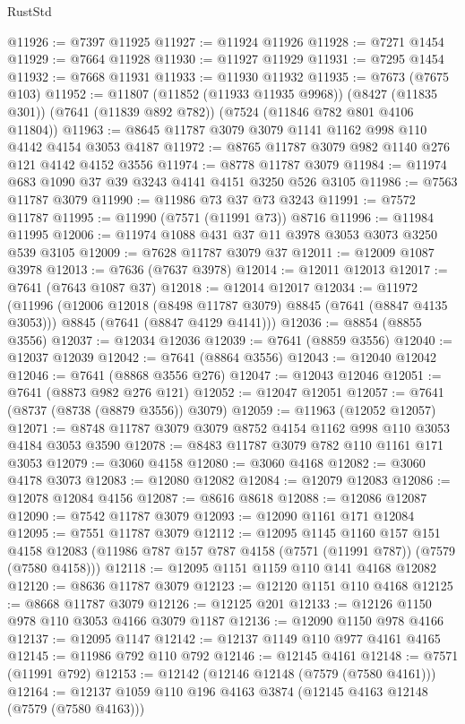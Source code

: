 \begin{lexlean}{RustStd}
\begin{coremodule}
{\begin{coremodule}
{{{{{{{{{{{{{{{{{{{{{{{{{{{{{{{{@11926 := @7397 @11925
@11927 := @11924 @11926
@11928 := @7271 @1454
@11929 := @7664 @11928
@11930 := @11927 @11929
@11931 := @7295 @1454
@11932 := @7668 @11931
@11933 := @11930 @11932
@11935 := @7673 (@7675 @103)
@11952 := @11807
    (@11852 (@11933 @11935 @9968))
    (@8427 (@11835 @301))
    (@7641 (@11839 @892 @782))
    (@7524 (@11846 @782 @801 @4106 @11804))
@11963 := @8645 @11787 @3079 @3079 @1141 @1162 @998 @110 @4142 @4154 @3053 @4187
@11972 := @8765 @11787 @3079 @982 @1140 @276 @121 @4142 @4152 @3556
@11974 := @8778 @11787 @3079
@11984 := @11974 @683 @1090 @37 @39 @3243 @4141 @4151 @3250 @526 @3105
@11986 := @7563 @11787 @3079
@11990 := @11986 @73 @37 @73 @3243
@11991 := @7572 @11787
@11995 := @11990 (@7571 (@11991 @73)) @8716
@11996 := @11984 @11995
@12006 := @11974 @1088 @431 @37 @11 @3978 @3053 @3073 @3250 @539 @3105
@12009 := @7628 @11787 @3079 @37
@12011 := @12009 @1087 @3978
@12013 := @7636 (@7637 @3978)
@12014 := @12011 @12013
@12017 := @7641 (@7643 @1087 @37)
@12018 := @12014 @12017
@12034 := @11972
    (@11996
      (@12006 @12018 (@8498 @11787 @3079) @8845 (@7641 (@8847 @4135 @3053)))
      @8845
      (@7641 (@8847 @4129 @4141)))
@12036 := @8854 (@8855 @3556)
@12037 := @12034 @12036
@12039 := @7641 (@8859 @3556)
@12040 := @12037 @12039
@12042 := @7641 (@8864 @3556)
@12043 := @12040 @12042
@12046 := @7641 (@8868 @3556 @276)
@12047 := @12043 @12046
@12051 := @7641 (@8873 @982 @276 @121)
@12052 := @12047 @12051
@12057 := @7641 (@8737 (@8738 (@8879 @3556)) @3079)
@12059 := @11963 (@12052 @12057)
@12071 := @8748 @11787 @3079 @3079 @8752 @4154 @1162 @998 @110 @3053 @4184 @3053 @3590
@12078 := @8483 @11787 @3079 @782 @110 @1161 @171 @3053
@12079 := @3060 @4158
@12080 := @3060 @4168
@12082 := @3060 @4178 @3073
@12083 := @12080 @12082
@12084 := @12079 @12083
@12086 := @12078 @12084 @4156
@12087 := @8616 @8618
@12088 := @12086 @12087
@12090 := @7542 @11787 @3079
@12093 := @12090 @1161 @171 @12084
@12095 := @7551 @11787 @3079
@12112 := @12095
    @1145
    @1160
    @157
    @151
    @4158
    @12083
    (@11986 @787 @157 @787 @4158 (@7571 (@11991 @787)) (@7579 (@7580 @4158)))
@12118 := @12095 @1151 @1159 @110 @141 @4168 @12082
@12120 := @8636 @11787 @3079
@12123 := @12120 @1151 @110 @4168
@12125 := @8668 @11787 @3079
@12126 := @12125 @201
@12133 := @12126 @1150 @978 @110 @3053 @4166 @3079 @1187
@12136 := @12090 @1150 @978 @4166
@12137 := @12095 @1147
@12142 := @12137 @1149 @110 @977 @4161 @4165
@12145 := @11986 @792 @110 @792
@12146 := @12145 @4161
@12148 := @7571 (@11991 @792)
@12153 := @12142 (@12146 @12148 (@7579 (@7580 @4161)))
@12164 := @12137 @1059 @110 @196 @4163 @3874 (@12145 @4163 @12148 (@7579 (@7580 @4163)))
}}}}}}}}}}}}}}}}}}}}}}}}}}}}}}}}
\end{coremodule}}
\end{coremodule}
\end{lexlean}
